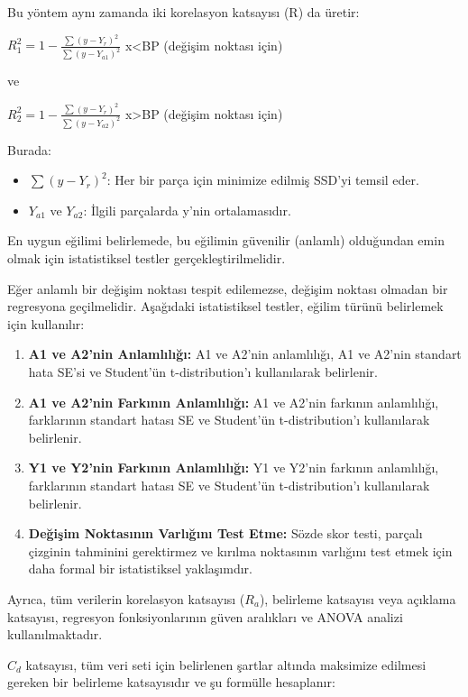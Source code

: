 \documentclass[12pt,twoside]{deuthesis}
\begin{document}
Bu yöntem aynı zamanda iki korelasyon katsayısı (R) da üretir:

\(R_{1}^{2}=1-{\frac {\sum (y-Y_{r})^{2}}{\sum (y-Y_{a1})^{2}}}\) x\textless BP (değişim noktası için)

ve

\(R_{2}^{2}=1-{\frac {\sum (y-Y_{r})^{2}}{\sum (y-Y_{a2})^{2}}}\) x\textgreater BP (değişim noktası için)

Burada:

\begin{itemize}
\item $\sum (y-Y_{r})^{2}$: Her bir parça için minimize edilmiş SSD'yi temsil eder.
\item $Y_{a1}$ ve $Y_{a2}$: İlgili parçalarda y'nin ortalamasıdır.
\end{itemize}

En uygun eğilimi belirlemede, bu eğilimin güvenilir (anlamlı) olduğundan emin olmak için istatistiksel testler gerçekleştirilmelidir.

Eğer anlamlı bir değişim noktası tespit edilemezse, değişim noktası olmadan bir regresyona geçilmelidir. Aşağıdaki istatistiksel testler, eğilim türünü belirlemek için kullanılır:

\begin{enumerate}
\item \textbf{A1 ve A2'nin Anlamlılığı:} A1 ve A2'nin anlamlılığı, A1 ve A2'nin standart hata SE'si ve Student'ün t-distribution'ı kullanılarak belirlenir.
\item \textbf{A1 ve A2'nin Farkının Anlamlılığı:} A1 ve A2'nin farkının anlamlılığı, farklarının standart hatası SE ve Student'ün t-distribution'ı kullanılarak belirlenir.
\item \textbf{Y1 ve Y2'nin Farkının Anlamlılığı:} Y1 ve Y2'nin farkının anlamlılığı, farklarının standart hatası SE ve Student'ün t-distribution'ı kullanılarak belirlenir.
\item \textbf{Değişim Noktasının Varlığını Test Etme:} Sözde skor testi, parçalı çizginin tahminini gerektirmez ve kırılma noktasının varlığını test etmek için daha formal bir istatistiksel yaklaşımdır.
\end{enumerate}

Ayrıca, tüm verilerin korelasyon katsayısı (\(R_{a}\)), belirleme katsayısı veya açıklama katsayısı, regresyon fonksiyonlarının güven aralıkları ve ANOVA analizi kullanılmaktadır.

\(C_{d}\) katsayısı, tüm veri seti için belirlenen şartlar altında maksimize edilmesi gereken bir belirleme katsayısıdır ve şu formülle hesaplanır:
\end{document}
